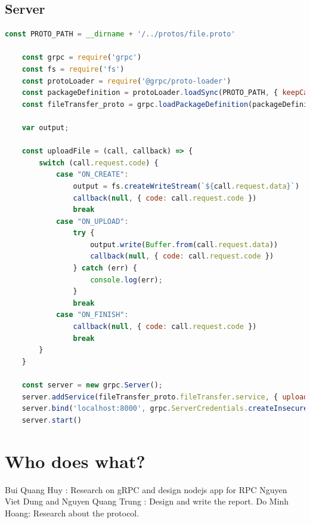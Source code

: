 \documentclass{article}
\begin{document}
\subsection{Server}
\begin{lstlisting}[language=javascript]
    const PROTO_PATH = __dirname + '/../protos/file.proto'

    const grpc = require('grpc')
    const fs = require('fs')
    const protoLoader = require('@grpc/proto-loader')
    const packageDefinition = protoLoader.loadSync(PROTO_PATH, { keepCase: true, longs: String, enums: String, defaults: true, oneofs: true })
    const fileTransfer_proto = grpc.loadPackageDefinition(packageDefinition).fileTransfer
    
    var output;
    
    const uploadFile = (call, callback) => {
        switch (call.request.code) {
            case "ON_CREATE":
                output = fs.createWriteStream(`${call.request.data}`)
                callback(null, { code: call.request.code })
                break
            case "ON_UPLOAD":
                try {
                    output.write(Buffer.from(call.request.data))
                    callback(null, { code: call.request.code })
                } catch (err) {
                    console.log(err);
                }
                break
            case "ON_FINISH":
                callback(null, { code: call.request.code })
                break
        }
    }
    
    const server = new grpc.Server();
    server.addService(fileTransfer_proto.fileTransfer.service, { uploadFile: uploadFile })
    server.bind('localhost:8000', grpc.ServerCredentials.createInsecure())
    server.start()
\end{lstlisting}

\section{Who does what?}
    Bui Quang Huy : Research on gRPC and design nodejs app for RPC
    \newline
    Nguyen Viet Dung and Nguyen Quang Trung : Design and write the report.
    \newline
    Do Minh Hoang: Research about the protocol.
\end{document}
